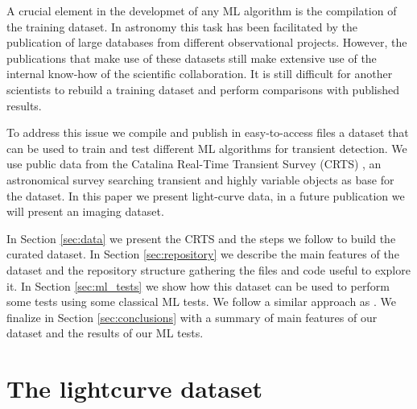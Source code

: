\documentclass[a4paper,fleqn,usenatbib]{mnras}
\begin{document}
A crucial element in the developmet of any ML algorithm is the
compilation of the training dataset. 
In astronomy this task has been facilitated by the publication of
large databases from different observational projects. 
However, the publications that make use of these datasets still make
extensive use of the internal know-how of the scientific
collaboration. 
It is still difficult for another scientists to rebuild a training
dataset and perform comparisons with published results.

To address this issue we compile and publish in easy-to-access files a
dataset that can be used to train and test different ML algorithms for
transient detection.
We use public data from the Catalina Real-Time Transient Survey
(CRTS) \citep{1111.2566}, an astronomical survey searching transient
and highly variable objects as base for the dataset.
In this paper we present light-curve data, in a future publication we
will present an imaging dataset. 

In Section \ref{sec:data} we present the CRTS and the steps we follow
to build the curated dataset. 
In Section \ref{sec:repository} we describe the main features of the
dataset and the repository structure gathering the files and code
useful to explore it. 
In Section \ref{sec:ml_tests} we show how this dataset can be used to
perform some tests using some classical ML tests. 
We follow a similar approach as \cite{1601.03931}. 
We finalize in Section \ref{sec:conclusions} with a summary of main
features of our dataset and the results of our ML tests.

\section{The lightcurve dataset} \label{section_data}
\end{document}
